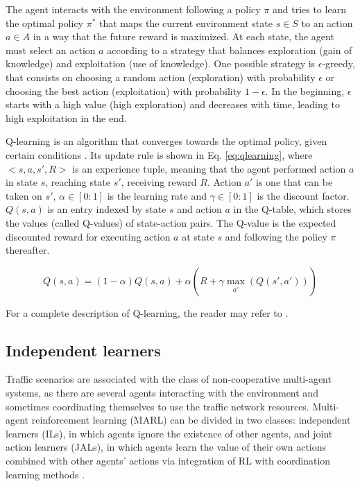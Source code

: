 \documentclass{RITA}
\begin{document}
The agent interacts with the environment following a policy $\pi$ and tries to learn the optimal policy $\pi^*$ that maps the current environment state $s \in S$ to an action $a \in A$ in a way that the future reward is maximized. At each state, the agent must select an action $a$ according to a strategy that balances exploration (gain of knowledge) and exploitation (use of knowledge). One possible strategy is $\epsilon$-greedy, that consists on choosing a random action (exploration) with probability $\epsilon$ or choosing the best action (exploitation) with probability $1 - \epsilon$. In the beginning, $\epsilon$ starts with a high value (high exploration) and decreases with time, leading to high exploitation in the end.

Q-learning is an algorithm that converges towards the optimal policy, given certain conditions \cite{Watkins&Dayan1992}. Its update rule is shown in Eq. \eqref{eq:qlearning}, where $<s,a,s',R>$ is an experience tuple, meaning that the agent performed action $a$ in state $s$, reaching state $s'$, receiving reward $R$. Action $a'$ is one that can be taken on $s'$, $\alpha \in [0:1]$ is the learning rate and $\gamma \in [0:1]$ is the discount factor. $Q(s,a)$ is an entry indexed by state $s$ and action $a$ in the Q-table, which stores the values (called Q-values) of state-action pairs. The Q-value is the expected discounted reward for executing action $a$ at
state $s$ and following the policy $\pi$ thereafter.

\begin{equation}
\label{eq:qlearning}
Q(s,a) = (1 - \alpha) Q(s,a) + \alpha (R + \gamma \max_{\substack{a'}}(Q(s',a')))
\end{equation}

For a complete description of Q-learning, the reader may refer to \cite{Watkins&Dayan1992}.



\subsection{Independent learners} 
Traffic scenarios are associated with the class of non-cooperative multi-agent systems, as there are several agents interacting with the environment and sometimes coordinating themselves to use the traffic network resources. Multi-agent reinforcement learning (MARL) can be divided in two classes: independent learners (ILs), in which agents ignore the existence of other agents, and joint action learners (JALs), in which agents learn the value of their own actions combined with other agents' actions via integration of RL with coordination learning methods \cite{Claus&Boutilier1998}. 
\end{document}
